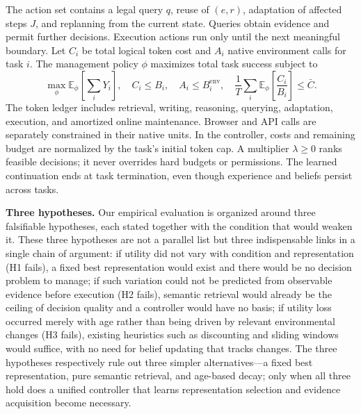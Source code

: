 \documentclass[sigconf,anonymous,review]{acmart}
\newcommand{\E}{\mathbb{E}}
\theoremstyle{zhplain}
\begin{document}
The action set contains a legal query \(q\), reuse of \((e,r)\), adaptation of affected steps \(J\), and replanning from the current state. Queries obtain evidence and permit further decisions. Execution actions run only until the next meaningful boundary. Let \(C_i\) be total logical token cost and \(A_i\) native environment calls for task \(i\). The management policy \(\phi\) maximizes total task success subject to
\begin{equation}
\max_{\phi}\E_{\phi}\!\left[\sum_iY_i\right],\quad
 C_i\le B_i,\quad A_i\le B_i^{\mathrm{env}},\quad
 \frac1T\sum_i\E_{\phi}\!\left[\frac{C_i}{B_i}\right]\le\bar C.
\label{eq:objective}
\end{equation}
The token ledger includes retrieval, writing, reasoning, querying, adaptation, execution, and amortized online maintenance. Browser and API calls are separately constrained in their native units. In the controller, costs and remaining budget are normalized by the task's initial token cap. A multiplier \(\lambda\ge0\) ranks feasible decisions; it never overrides hard budgets or permissions. The learned continuation ends at task termination, even though experience and beliefs persist across tasks.

\textbf{Three hypotheses.} Our empirical evaluation is organized around three falsifiable hypotheses, each stated together with the condition that would weaken it. These three hypotheses are not a parallel list but three indispensable links in a single chain of argument: if utility did not vary with condition and representation (H1 fails), a fixed best representation would exist and there would be no decision problem to manage; if such variation could not be predicted from observable evidence before execution (H2 fails), semantic retrieval would already be the ceiling of decision quality and a controller would have no basis; if utility loss occurred merely with age rather than being driven by relevant environmental changes (H3 fails), existing heuristics such as discounting and sliding windows would suffice, with no need for belief updating that tracks changes. The three hypotheses respectively rule out three simpler alternatives---a fixed best representation, pure semantic retrieval, and age-based decay; only when all three hold does a unified controller that learns representation selection and evidence acquisition become necessary.
\end{document}
